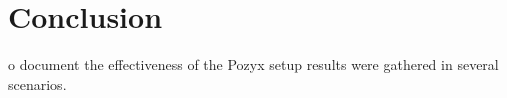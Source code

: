 \chapter{Conclusion}\label{ch:conclusion}
o document the effectiveness of the Pozyx setup results were gathered in several scenarios.
\lipsum[2-8]